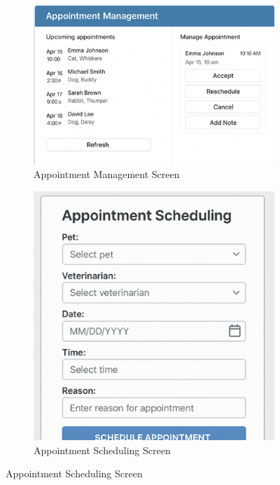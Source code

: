 \documentclass[12pt,a4paper,twoside]{book}
\begin{document}
\begin{figure}[H]
    \centering
    \begin{subfigure}[b]{0.48\textwidth}
        \centering
        \includegraphics[width=\textwidth]{Mockup Screens/Appointment_Management.png}
        \caption{Appointment Management Screen}\label{fig:mockup7}
    \end{subfigure}
    \hfill
    \begin{subfigure}[b]{0.48\textwidth}
        \centering
        \includegraphics[width=\textwidth]{Mockup Screens/Appointment_Scheduling.png}
        \caption{Appointment Scheduling Screen}\label{fig:mockup8}
    \end{subfigure}
\end{figure}
\end{document}
